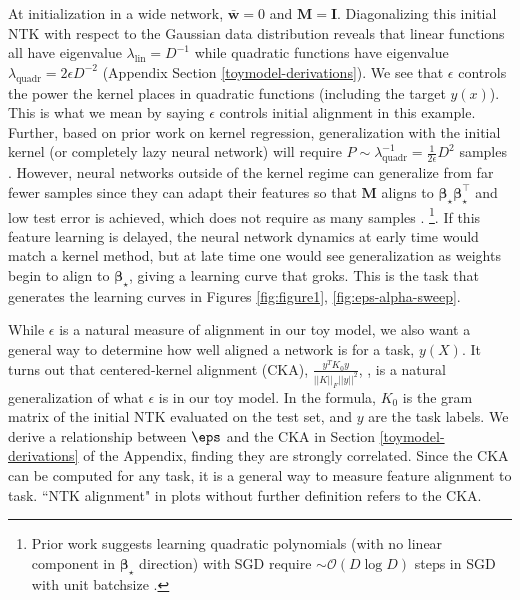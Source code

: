 \documentclass{article} %
\def\w{\bm w}
\def\M{\bm M}
\begin{document}
At initialization in a wide network, $\bar{\w} = 0$ and $\bm M = \bm I$. Diagonalizing this initial NTK with respect to the Gaussian data distribution reveals that linear functions all have eigenvalue $\lambda_{\text{lin}} = D^{-1}$ while quadratic functions have eigenvalue $\lambda_{\text{quadr}} = 2 \epsilon D^{-2}$ (Appendix Section \ref{toymodel-derivations}). We see that $\epsilon$ controls the power the kernel places in quadratic functions (including the target $y(x)$). This is what we mean by saying $\epsilon$ controls initial alignment in this example. Further, based on prior work on kernel regression, generalization with the initial kernel (or completely lazy neural network) will require $P \sim \lambda_{\text{quadr}}^{-1} = \frac{1}{2 \epsilon} D^2$ samples \citep{bordelon2020spectrum, canatar2021spectral, simon2023eigenlearning, xiao2022precise}.  However, neural networks outside of the kernel regime can generalize from far fewer samples since they can adapt their features so that $\M$ aligns to $\bm\beta_\star \bm\beta_\star^\top$ and low test error is achieved, which does not require as many samples \citep{ghorbani2019limitations, atanasov2022onset}. \footnote{Prior work suggests learning quadratic polynomials (with no linear component in $\bm\beta_\star$ direction) with SGD require $\sim \mathcal{O}( D \log D )$ steps in SGD with unit batchsize \citep{arous2021online}.}. If this feature learning is delayed, the neural network dynamics at early time would match a kernel method, but at late time one would see generalization as weights begin to align to $\bm\beta_\star$, giving a learning curve that groks. This is the task that generates the learning curves in Figures \ref{fig:figure1}, \ref{fig:eps-alpha-sweep}.

While $\epsilon$ is a natural measure of alignment in our toy model, we also want a general way to determine how well aligned a network is for a task, $y(X)$. 
It turns out that centered-kernel alignment (CKA), $\frac{y^T K_0 y}{||K||_F||y||^2}$, \citep{kornblith2019similarity, cortes2012algorithms, atanasov2022onset, arora2019fine}, is a natural generalization of what $\epsilon$ is in our toy model. In the formula, $K_0$ is the gram matrix of the initial NTK evaluated on the test set, and $y$ are the task labels. We derive a relationship between $\eps$ and the CKA in Section \ref{toymodel-derivations} of the Appendix, finding they are strongly correlated. Since the CKA can be computed for any task, it is a general way to measure feature alignment to task. ``NTK alignment" in plots without further definition refers to the CKA. 
\end{document}
